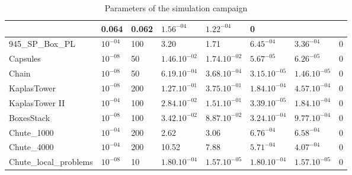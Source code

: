 \begin{frame}
\begin{table}
\begin{tabular}{|l|l|l|l|l|l|l|l|}
  & 0.064
  & 0.062
  & $1.56^{-04}$
  & $1.22^{-04}$
  & 0
  \\
  \hline
  945\_SP\_Box\_PL
  & $10^{-04}$
  & 100
  & 3.20
  & 1.71
  & $6.45^{-04}$
  & $3.36^{-04}$
  & 0
  \\
  \hline
  Capsules
  & $10^{-08}$
  & 50
  & $1.46.10^{-02}$
  & $1.74.10^{-02}$
  & $5.67^{-05}$
  & $6.26^{-05}$
  & 0
  \\
  \hline
  Chain
  & $10^{-08}$
  & 50
  & $6.19.10^{-04}$
  & $3.68.10^{-04}$
  & $3.15.10^{-05}$
  & $1.46.10^{-05}$
  & 0
  \\
  \hline
  KaplasTower
  & $10^{-08}$
  & 200
  & $1.27.10^{-01}$
  & $3.75.10^{-01}$
  & $1.84.10^{-04}$
  & $4.57.10^{-04}$
  & 0
  \\
  \hline
  KaplasTower II
  & $10^{-04}$
  & 100
  & $2.84.10^{-02}$
  & $1.51.10^{-01}$
  & $3.39.10^{-05}$
  & $1.84.10^{-04}$
  & 0
  \\
  \hline
  BoxesStack
  & $10^{-08}$
  & 100
  & $3.42.10^{-02}$
  & $8.87.10^{-02}$
  & $3.24.10^{-04}$
  & $9.77.10^{-04}$
  & 0
  \\
  \hline
  Chute\_1000
  & $10^{-04}$
  & 200
  & 2.62
  & 3.06
  & $6.76^{-04}$
  & $6.58^{-04}$
  & 0
  \\
  \hline
  Chute\_4000
  & $10^{-04}$
  & 200
  & 10.52
  & 7.88
  & $5.71^{-04}$
  & $4.07^{-04}$
  & 0
  \\
  \hline
  Chute\_local\_problems
  & $10^{-08}$
  & 10
  & $1.80.10^{-04}$
  & $1.57.10^{-05}$
  & $1.80.10^{-04}$
  & $1.57.10^{-05}$
  &  0 \\
  \hline
\end{tabular}
\caption{Parameters of the simulation campaign}
\label{Tab:fclib-simulation}
\end{table}

\end{frame}

